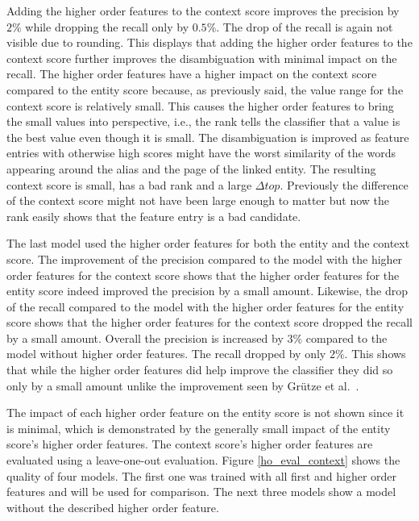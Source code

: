 Adding the higher order features to the context score improves the precision by $2\%$ while dropping the recall only by $0.5\%$. The drop of the recall is again not visible due to rounding. This displays that adding the higher order features to the context score further improves the disambiguation with minimal impact on the recall. The higher order features have a higher impact on the context score compared to the entity score because, as previously said, the value range for the context score is relatively small. This causes the higher order features to bring the small values into perspective, i.e., the rank tells the classifier that a value is the best value even though it is small. The disambiguation is improved as feature entries with otherwise high scores might have the worst similarity of the words appearing around the alias and the page of the linked entity. The resulting context score is small, has a bad rank and a large $\Delta top$. Previously the difference of the context score might not have been large enough to matter but now the rank easily shows that the feature entry is a bad candidate.\par
The last model used the higher order features for both the entity and the context score. The improvement of the precision compared to the model with the higher order features for the context score shows that the higher order features for the entity score indeed improved the precision by a small amount. Likewise, the drop of the recall compared to the model with the higher order features for the entity score shows that the higher order features for the context score dropped the recall by a small amount. Overall the precision is increased by $3\%$ compared to the model without higher order features. The recall dropped by only $2\%$. This shows that while the higher order features did help improve the classifier they did so only by a small amount unlike the improvement seen by Grütze et al.\ \cite{coheel}.\par
The impact of each higher order feature on the entity score is not shown since it is minimal, which is demonstrated by the generally small impact of the entity score's higher order features. The context score's higher order features are evaluated using a leave-one-out evaluation. Figure \ref{ho_eval_context} shows the quality of four models. The first one was trained with all first and higher order features and will be used for comparison. The next three models show a model without the described higher order feature.\par
